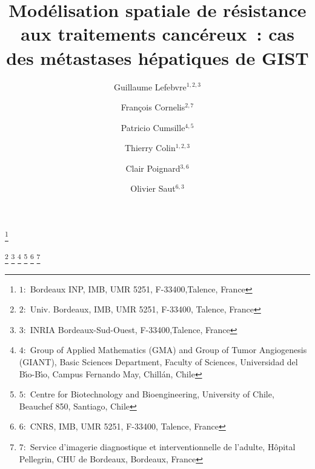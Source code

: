 \documentclass[11pt]{amsart}
\numberwithin{equation}{section}
\begin{document}
\title[Modélisation spatiale de résistances aux traitements cancéreux]{Modélisation spatiale de résistance aux traitements cancéreux~: cas des métastases hépatiques de GIST}

\thanks{$1$:~Bordeaux INP, IMB, UMR 5251, F-33400,Talence, France}

\thanks{$2$:~Univ. Bordeaux, IMB, UMR 5251, F-33400, Talence, France}
\thanks{$3$:~INRIA Bordeaux-Sud-Ouest, F-33400,Talence, France}
\thanks{$4$:~Group of Applied Mathematics (GMA) and Group of Tumor
  Angiogenesis (GIANT), Basic Sciences Department, Faculty of
  Sciences, Universidad del B\'\i o-B\'\i o, Campus Fernando May, Chill\'an, Chile}
\thanks{$5$:~Centre for Biotechnology and Bioengineering, University
  of Chile, Beauchef 850, Santiago, Chile}
\thanks{$6$:~CNRS, IMB, UMR 5251, F-33400, Talence, France}
\thanks{$7$:~Service d'imagerie diagnostique et interventionnelle de l'adulte, H\^opital Pellegrin, CHU de Bordeaux, Bordeaux, France}

\author[G. Lefebvre]{Guillaume Lefebvre$^{1,2,3}$}

\author[F. Cornelis]{Fran\c cois Cornelis$^{2,7}$}

\author[P. Cumsille]{Patricio Cumsille$^{4,5}$}

\author[T. Colin]{Thierry Colin$^{1,2,3}$}


\author[C. Poignard]{Clair Poignard$^{3,6}$}

\author[O. Saut]{Olivier Saut$^{6,3}$}

\maketitle
\end{document}
